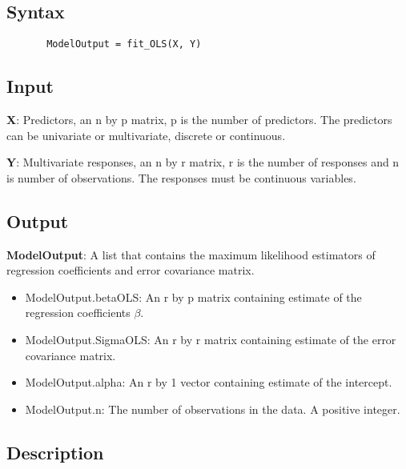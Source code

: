 \documentclass[a4paper,11pt,openany]{memoir}
\begin{document}
\subsection*{Syntax}


\begin{verbatim}       ModelOutput = fit_OLS(X, Y)\end{verbatim}
    

\subsection*{Input}

\begin{par}
\textbf{X}: Predictors, an n by p matrix, p is the number of predictors.  The predictors can be univariate or multivariate, discrete or continuous.
\end{par} \vspace{1em}
\begin{par}
\textbf{Y}: Multivariate responses, an n by r matrix, r is the number of responses and n is number of observations.  The responses must be continuous variables.
\end{par} \vspace{1em}


\subsection*{Output}

\begin{par}
\textbf{ModelOutput}: A list that contains the maximum likelihood estimators of regression coefficients and error covariance matrix.
\end{par} \vspace{1em}
\begin{itemize}
\setlength{\itemsep}{-1ex}
   \item ModelOutput.betaOLS: An r by p matrix containing estimate of the regression coefficients $\beta$.
   \item ModelOutput.SigmaOLS: An r by r matrix containing estimate of the error covariance matrix.
   \item ModelOutput.alpha: An r by 1 vector containing estimate of the intercept.
   \item ModelOutput.n: The number of observations in the data.  A positive integer.
\end{itemize}


\subsection*{Description}
\end{document}
